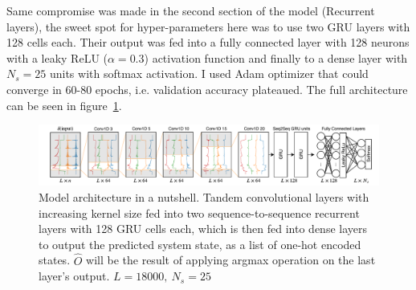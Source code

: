 Same compromise was made in the second section of the model (Recurrent layers), the sweet spot for hyper-parameters here was to use two GRU layers with 128 cells each. Their output was fed into a fully connected layer with 128 neurons with a leaky ReLU ($\alpha=0.3$) activation function \cite{maas2013rectifier} and finally to a dense layer with $N_s=25$ units with softmax activation.
I used Adam optimizer \cite{kingma2014adam} that could converge in 60-80 epochs, i.e. validation accuracy plateaued. The full architecture can be seen in figure~\ref{fig:model_arch}.
\begin{figure}
    \centering
    \includegraphics[width=\linewidth]{ASE_files/Convolutional_Net.pdf}
    \caption{Model architecture in a nutshell. Tandem convolutional layers with increasing kernel size fed into two sequence-to-sequence recurrent layers with 128 GRU cells each, which is then fed into dense layers to output the predicted system state, as a list of one-hot encoded states. $\hat{O}$ will be the result of applying argmax operation on the last layer's output. $L=18000,\: N_s=25$}
    \label{fig:model_arch}
\end{figure}

